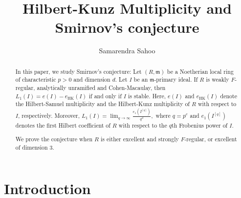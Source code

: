\documentclass[11pt, reqno]{amsart}
\theoremstyle{plain}
\theoremstyle{plain}
\begin{document}
\title{\large \textbf{Hilbert-Kunz Multiplicity and Smirnov's conjecture}}

\author{Samarendra Sahoo}
\address{ Indian Institute of Technology Dharwad, Dharwad, Karnataka, India, 580011}



\begin{abstract}
 In this paper, we study Smirnov's conjecture: Let $(R,\mathfrak{m})$ be a Noetherian local ring of characteristic $p>0$ and dimension $d$. Let $I$ be an $\mathfrak{m}$-primary ideal. If $R$ is weakly $F$-regular, analytically unramified and Cohen-Macaulay, then $\displaystyle L_1(I)=e(I)-e_{\mathrm{HK}}(I)$ if and only if $I$ is stable. Here, $e(I)$ and $e_{\mathrm{HK}}(I)$ denote the Hilbert-Samuel multiplicity and the Hilbert-Kunz multiplicity of $R$ with respect to $I$, respectively. Moreover, $\displaystyle L_1(I)=\lim_{q\to\infty}
\frac{e_1(I^{[q]})}{q^d},$ where $q=p^e$ and $e_1(I^{[q]})$ denotes the first Hilbert coefficient of $R$ with respect to the $q$th Frobenius power of $I$.

We prove the conjecture when $R$ is either excellent and strongly $F$-regular, or excellent of dimension $3$.


\end{abstract}





\maketitle

\section{Introduction}
\end{document}

